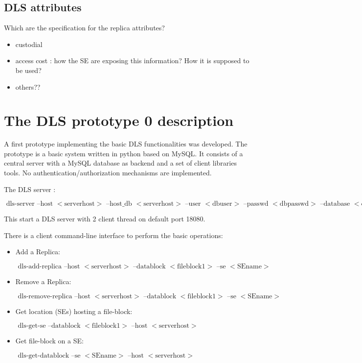 \documentclass[pdftex]{cmspaper}
\begin{document}
\subsection{DLS attributes}
 Which are the specification for the replica attributes?
\begin{itemize}
\item custodial
\item access cost : how the SE are exposing this information? How it is supposed to be used?
\item others?? 
\end{itemize}

\section{The DLS prototype 0 description}
\label{sec:proto0}

 A first prototype implementing the basic DLS functionalities was developed.  
 The prototype is a basic system written in python based on MySQL. 
 It consists of a central server with a MySQL database as backend and 
 a set of client libraries tools. No authentication/authorization mechanisms
 are implemented.

 The DLS server :
 \begin{flushleft}
  $\mbox{ dls-server --host $<$serverhost$>$ --host\_db $<$serverhost$>$ --user $<$dbuser$>$ --passwd $<$dbpasswd$>$ --database $<$dbname$>$ --num\_thread 2}$
 \end{flushleft}
  This start a DLS server with 2 client thread on default port 18080.

 There is a client command-line interface to perform the basic operations: 
 \begin{itemize}
   \item Add a Replica: 
\begin{flushleft}
  $\mbox{ dls-add-replica --host $<$serverhost$>$ --datablock $<$fileblock1$>$ --se $<$SEname$>$ }$
\end{flushleft}

   \item Remove a Replica:
\begin{flushleft}
 $\mbox{ dls-remove-replica --host $<$serverhost$>$ --datablock $<$fileblock1$>$ --se $<$SEname$>$ }$
\end{flushleft}

  \item Get location (SEs) hosting a file-block:
\begin{flushleft}
$\mbox{ dls-get-se --datablock $<$fileblock1$>$ --host $<$serverhost$>$}$
\end{flushleft}
  \item Get file-block on a SE:
\begin{flushleft}
$\mbox{ dls-get-datablock --se $<$SEname$>$ --host $<$serverhost$>$}$
\end{flushleft}
   \end{itemize}
\end{document}
